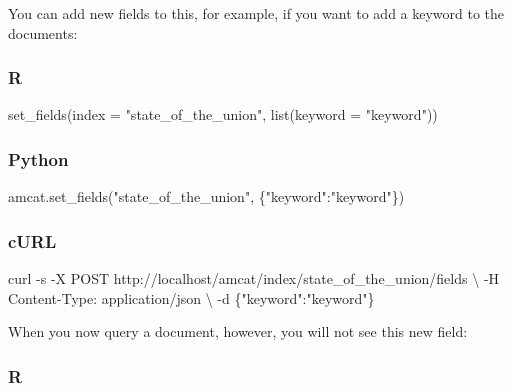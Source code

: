 \documentclass[
  letterpaper,
  DIV=11,
  numbers=noendperiod]{scrreprt}
\newenvironment{Shaded}{\begin{snugshade}}{\end{snugshade}}
\newcommand{\AttributeTok}[1]{\textcolor[rgb]{0.40,0.45,0.13}{#1}}
\newcommand{\DataTypeTok}[1]{\textcolor[rgb]{0.68,0.00,0.00}{#1}}
\newcommand{\ExtensionTok}[1]{\textcolor[rgb]{0.00,0.23,0.31}{#1}}
\newcommand{\FunctionTok}[1]{\textcolor[rgb]{0.28,0.35,0.67}{#1}}
\newcommand{\NormalTok}[1]{\textcolor[rgb]{0.00,0.23,0.31}{#1}}
\newcommand{\StringTok}[1]{\textcolor[rgb]{0.13,0.47,0.30}{#1}}
\begin{document}
You can add new fields to this, for example, if you want to add a
keyword to the documents:

\subsubsection{R}

\begin{Shaded}
\begin{Highlighting}[]
\FunctionTok{set\_fields}\NormalTok{(}\AttributeTok{index =} \StringTok{"state\_of\_the\_union"}\NormalTok{, }\FunctionTok{list}\NormalTok{(}\AttributeTok{keyword =} \StringTok{"keyword"}\NormalTok{))}
\end{Highlighting}
\end{Shaded}

\subsubsection{Python}

\begin{Shaded}
\begin{Highlighting}[]
\NormalTok{amcat.set\_fields(}\StringTok{"state\_of\_the\_union"}\NormalTok{, \{}\StringTok{"keyword"}\NormalTok{:}\StringTok{"keyword"}\NormalTok{\})}
\end{Highlighting}
\end{Shaded}

\subsubsection{cURL}

\begin{Shaded}
\begin{Highlighting}[]
\ExtensionTok{curl} \AttributeTok{{-}s} \AttributeTok{{-}X}\NormalTok{ POST http://localhost/amcat/index/state\_of\_the\_union/fields }\DataTypeTok{\textbackslash{}}
  \AttributeTok{{-}H} \StringTok{\textquotesingle{}Content{-}Type: application/json\textquotesingle{}} \DataTypeTok{\textbackslash{}}
  \AttributeTok{{-}d} \StringTok{\textquotesingle{}\{"keyword":"keyword"\}\textquotesingle{}}
\end{Highlighting}
\end{Shaded}

When you now query a document, however, you will not see this new field:

\subsubsection{R}
\end{document}
